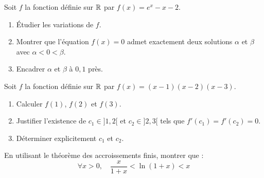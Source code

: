 \documentclass[../PolyS2.tex]{subfiles}
\begin{document}

Soit $f$ la fonction définie sur $\mathbb{R}$ par $f(x) = e^x - x - 2$.
\begin{enumerate}
    \item Étudier les variations de $f$.
    \item Montrer que l'équation $f(x) = 0$ admet exactement deux solutions $\alpha$ et $\beta$ avec $\alpha < 0 < \beta$.
    \item Encadrer $\alpha$ et $\beta$ à $0{,}1$ près.
\end{enumerate}


Soit $f$ la fonction définie sur $\mathbb{R}$ par $f(x) = (x-1)(x-2)(x-3)$.
\begin{enumerate}
    \item Calculer $f(1)$, $f(2)$ et $f(3)$.
    \item Justifier l'existence de $c_1 \in ]1, 2[$ et $c_2 \in ]2, 3[$ tels que $f'(c_1) = f'(c_2) = 0$.
    \item Déterminer explicitement $c_1$ et $c_2$.
\end{enumerate}


En utilisant le théorème des accroissements finis, montrer que :
$$\forall x > 0, \quad \frac{x}{1+x} < \ln(1+x) < x$$
\end{document}
